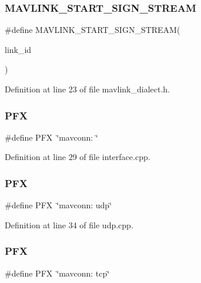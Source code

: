 \subsubsection{\texorpdfstring{MAVLINK\_START\_SIGN\_STREAM}{MAVLINK\_START\_SIGN\_STREAM}}
{\footnotesize\ttfamily \#define M\+A\+V\+L\+I\+N\+K\+\_\+\+S\+T\+A\+R\+T\+\_\+\+S\+I\+G\+N\+\_\+\+S\+T\+R\+E\+AM(\begin{DoxyParamCaption}\item[{}]{link\+\_\+id }\end{DoxyParamCaption})}



Definition at line 23 of file mavlink\+\_\+dialect.\+h.

\mbox{\label{group__mavconn_ga176e4c39a833f4d01f0ecd322c0f4343}} 
\subsubsection{\texorpdfstring{PFX}{PFX}\hspace{0.1cm}{\footnotesize\ttfamily [1/4]}}
{\footnotesize\ttfamily \#define P\+FX~\char`\"{}mavconn\+: \char`\"{}}



Definition at line 29 of file interface.\+cpp.

\mbox{\label{group__mavconn_ga176e4c39a833f4d01f0ecd322c0f4343}} 
\subsubsection{\texorpdfstring{PFX}{PFX}\hspace{0.1cm}{\footnotesize\ttfamily [2/4]}}
{\footnotesize\ttfamily \#define P\+FX~\char`\"{}mavconn\+: udp\char`\"{}}



Definition at line 34 of file udp.\+cpp.

\mbox{\label{group__mavconn_ga176e4c39a833f4d01f0ecd322c0f4343}} 
\subsubsection{\texorpdfstring{PFX}{PFX}\hspace{0.1cm}{\footnotesize\ttfamily [3/4]}}
{\footnotesize\ttfamily \#define P\+FX~\char`\"{}mavconn\+: tcp\char`\"{}}



